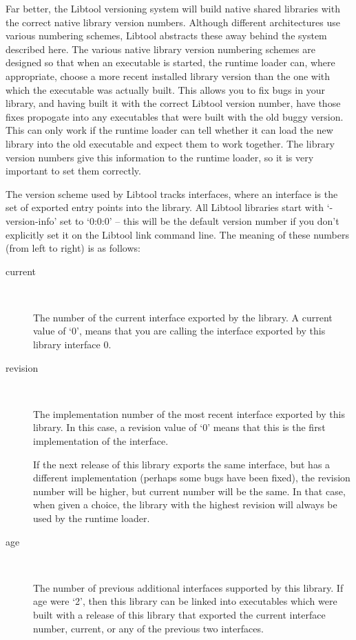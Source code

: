Far better, the Libtool versioning system will build native shared libraries with the correct native library version numbers. Although different architectures use various numbering schemes, Libtool abstracts these away behind the system described here. The various native library version numbering schemes are designed so that when an executable is started, the runtime loader can, where appropriate, choose a more recent installed library version than the one with which the executable was actually built. This allows you to fix bugs in your library, and having built it with the correct Libtool version number, have those fixes propogate into any executables that were built with the old buggy version. This can only work if the runtime loader can tell whether it can load the new library into the old executable and expect them to work together. The library version numbers give this information to the runtime loader, so it is very important to set them correctly. 


The version scheme used by Libtool tracks interfaces, where an interface is the set of exported entry points into the library. All Libtool libraries start with `-version-info' set to `0:0:0' -- this will be the default version number if you don't explicitly set it on the Libtool link command line. The meaning of these numbers (from left to right) is as follows: 

\begin{description}
\item[current]
\ 

%
The number of the current interface exported by the library. A current value of `0', means that you are calling the interface exported by this library interface 0. 

\item[revision]
\ 

%
The implementation number of the most recent interface exported by this library. In this case, a revision value of `0' means that this is the first implementation of the interface. 

If the next release of this library exports the same interface, but has a different implementation (perhaps some bugs have been fixed), the revision number will be higher, but current number will be the same. In that case, when given a choice, the library with the highest revision will always be used by the runtime loader. 


\item[age]
\ 

%
The number of previous additional interfaces supported by this library. If age were `2', then this library can be linked into executables which were built with a release of this library that exported the current interface number, current, or any of the previous two interfaces. 
\end{description}

